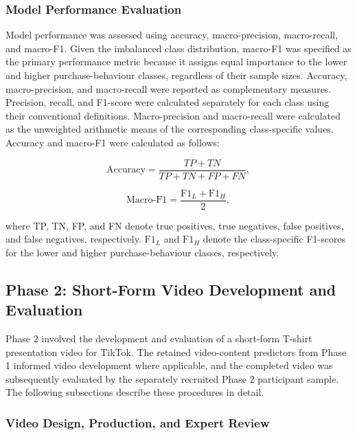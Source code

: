 \documentclass[jtaer,article,submit,moreauthors]{Definitions/mdpi}
\begin{document}
\subsubsection{Model Performance Evaluation}
Model performance was assessed using accuracy, macro-precision,
macro-recall, and macro-F1. Given the imbalanced class distribution,
macro-F1 was specified as the primary performance metric because it
assigns equal importance to the lower and higher purchase-behaviour
classes, regardless of their sample sizes. Accuracy, macro-precision,
and macro-recall were reported as complementary measures.
Precision, recall, and F1-score were calculated separately for each
class using their conventional definitions. Macro-precision and
macro-recall were calculated as the unweighted arithmetic means of the
corresponding class-specific values. Accuracy and macro-F1 were
calculated as follows:

\begin{equation}
	\mathrm{Accuracy}
	=
	\frac{TP+TN}{TP+TN+FP+FN},
\end{equation}

\begin{equation}
	\mathrm{Macro\mbox{-}F1}
	=
	\frac{\mathrm{F1}_{L}+\mathrm{F1}_{H}}{2},
\end{equation}

where TP, TN, FP, and FN denote true positives, true
negatives, false positives, and false negatives, respectively.
\(\mathrm{F1}_{L}\) and \(\mathrm{F1}_{H}\) denote the class-specific
F1-scores for the lower and higher purchase-behaviour classes,
respectively.

\subsection{Phase 2: Short-Form Video Development and Evaluation}

Phase 2 involved the development and evaluation of a short-form T-shirt presentation video for TikTok. The retained video-content predictors from Phase 1 informed video development where applicable, and the completed video was subsequently evaluated by the separately recruited Phase 2 participant sample. The following subsections describe these procedures in detail.

\subsubsection{Video Design, Production, and Expert Review}
\end{document}

